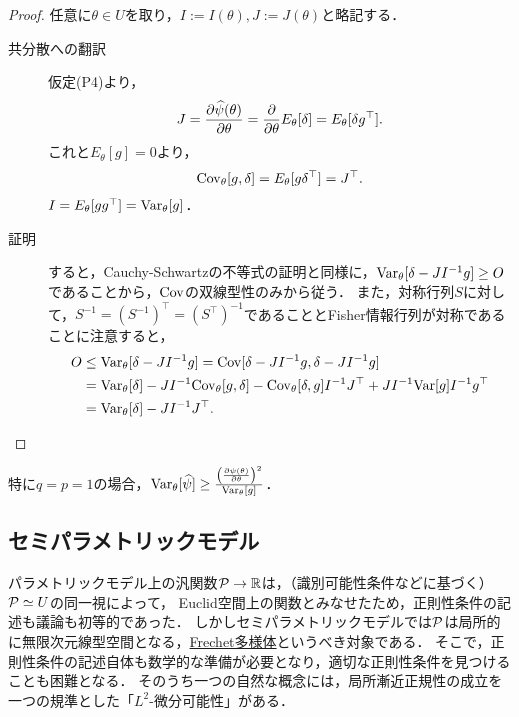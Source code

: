 \documentclass[uplatex, dvipdfmx]{jsarticle}
\begin{document}
\begin{proof}
    任意に$\theta\in U$を取り，$I:=I(\theta),J:=J(\theta)$と略記する．
    \begin{description}
        \item[共分散への翻訳] 仮定(P4)より，
        \[J=\pp{\wh{\psi}(\theta)}{\theta}=\pp{}{\theta}E_\theta[\delta]=E_\theta[\delta g^\top].\]
        これと$E_\theta[g]=0$より，
        \[\Cov_\theta[g,\delta]=E_\theta[g\delta^\top]=J^\top.\]
        $I=E_\theta[gg^\top]=\Var_\theta[g]$．
        \item[証明] すると，Cauchy-Schwartzの不等式の証明と同様に，$\Var_\theta[\delta-JI^{-1}g]\ge O$であることから，$\Cov$の双線型性のみから従う．
        また，対称行列$S$に対して，$S^{-1}=(S^{-1})^\top=(S^\top)^{-1}$であることとFisher情報行列が対称であることに注意すると，
        \begin{align*}
            O&\le\Var_\theta[\delta-JI^{-1}g]=\Cov[\delta-JI^{-1}g,\delta-JI^{-1}g]\\
            &=\Var_\theta[\delta]-JI^{-1}\Cov_\theta[g,\delta]-\Cov_\theta[\delta,g]I^{-1} J^\top+JI^{-1}\Var[g]I^{-1}g^\top\\
            &=\Var_\theta[\delta]-JI^{-1}J^\top.
        \end{align*}
    \end{description}
\end{proof}


\begin{corollary}
    特に$q=p=1$の場合，$\Var_\theta[\wh{\psi}]\ge\frac{\paren{\pp{\psi(\theta)}{\theta}}^2}{\Var_\theta[g]}$．
\end{corollary}

\subsection{セミパラメトリックモデル}

\begin{tcolorbox}[colframe=ForestGreen, colback=ForestGreen!10!white,breakable,colbacktitle=ForestGreen!40!white,coltitle=black,fonttitle=\bfseries\sffamily,
title=]
    パラメトリックモデル上の汎関数$\P\to\R$は，（識別可能性条件などに基づく）$\P\simeq U$の同一視によって，
    Euclid空間上の関数とみなせたため，正則性条件の記述も議論も初等的であった．
    しかしセミパラメトリックモデルでは$\P$は局所的に無限次元線型空間となる，\href{https://ncatlab.org/nlab/show/Fr%C3%A9chet+manifold}{Frechet多様体}というべき対象である．
    そこで，正則性条件の記述自体も数学的な準備が必要となり，適切な正則性条件を見つけることも困難となる．
    そのうち一つの自然な概念には，局所漸近正規性の成立を一つの規準とした「$L^2$-微分可能性」がある．
\end{tcolorbox}
\end{document}
